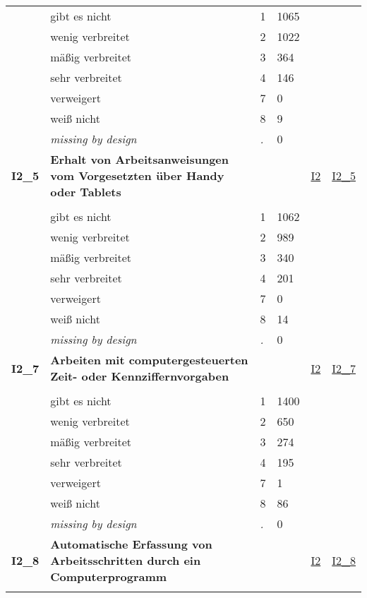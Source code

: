 \begin{longtable}{| L{2.45cm} | L{6cm} | C{1.5cm} | R{1cm} | C{2.25cm} | C{2.25cm} |}
   & gibt es nicht & 1 & 1065 &  &  \\ 
   & wenig verbreitet & 2 & 1022 &  &  \\ 
   & mäßig verbreitet & 3 & 364 &  &  \\ 
   & sehr verbreitet & 4 & 146 &  &  \\ 
   & verweigert & 7 & 0 &  &  \\ 
   & weiß nicht & 8 & 9 &  &  \\ 
   & \textit{missing by design} & \textit{.} & 0 &  &  \\ 
   \midrule
\textbf{I2\_5}\label{var:I2:5} & \textbf{Erhalt von Arbeitsanweisungen vom Vorgesetzten über Handy oder Tablets} &  &  & \hyperref[I2]{I2} & \hyperref[var:suf:I2:5]{I2\_5} \\ 
   &  &  &  &  &  \\ 
   & gibt es nicht & 1 & 1062 &  &  \\ 
   & wenig verbreitet & 2 & 989 &  &  \\ 
   & mäßig verbreitet & 3 & 340 &  &  \\ 
   & sehr verbreitet & 4 & 201 &  &  \\ 
   & verweigert & 7 & 0 &  &  \\ 
   & weiß nicht & 8 & 14 &  &  \\ 
   & \textit{missing by design} & \textit{.} & 0 &  &  \\ 
   \midrule
\textbf{I2\_7}\label{var:I2:7} & \textbf{Arbeiten mit computergesteuerten Zeit- oder Kennziffernvorgaben} &  &  & \hyperref[I2]{I2} & \hyperref[var:suf:I2:7]{I2\_7} \\ 
   &  &  &  &  &  \\ 
   & gibt es nicht & 1 & 1400 &  &  \\ 
   & wenig verbreitet & 2 & 650 &  &  \\ 
   & mäßig verbreitet & 3 & 274 &  &  \\ 
   & sehr verbreitet & 4 & 195 &  &  \\ 
   & verweigert & 7 & 1 &  &  \\ 
   & weiß nicht & 8 & 86 &  &  \\ 
   & \textit{missing by design} & \textit{.} & 0 &  &  \\ 
   \midrule
\textbf{I2\_8}\label{var:I2:8} & \textbf{Automatische Erfassung von Arbeitsschritten durch ein Computerprogramm} &  &  & \hyperref[I2]{I2} & \hyperref[var:suf:I2:8]{I2\_8} \\ 
   &  &  &  &  &  \\ 

\end{longtable}
